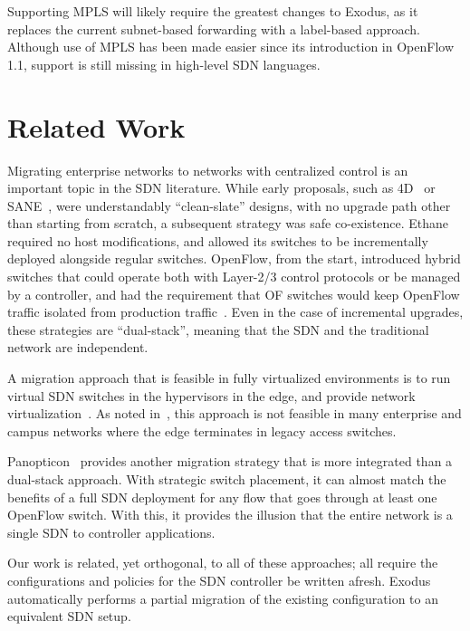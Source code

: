  Supporting MPLS will likely require the greatest changes
to Exodus, as it replaces the current subnet-based forwarding with a label-based approach.
Although use of MPLS has been made easier since its introduction in OpenFlow 1.1,
support is still missing in high-level SDN languages.

\section{Related Work}
\label{sec:relwork}

Migrating enterprise networks to networks with centralized control is
an important topic in the SDN literature. While early proposals, such as 4D~\cite{greenberg:ccr05-4d}
 or SANE~\cite{casado06sane}, were understandably ``clean-slate'' designs, with no
upgrade path other than starting from scratch, a subsequent strategy was safe co-existence.
Ethane~\cite{Casado07Ethane} required no host modifications, and allowed its switches to
be incrementally deployed alongside regular switches.
OpenFlow, from the start, introduced hybrid switches that could operate both with Layer-2/3 control
protocols or be managed by a controller, and had the requirement that OF switches would keep 
OpenFlow traffic isolated from production traffic~\cite{McKeown:ccr08-openflow}.
Even in the case of incremental upgrades, these strategies are ``dual-stack'', meaning that
the SDN and the traditional network are independent.

A migration approach that is feasible in fully virtualized
environments is to run virtual SDN switches in the hypervisors in the
edge, and provide network virtualization~\cite{Casado:hotsdn2012-fabric}.  As
noted in~\cite{levin13panopticonTR}, this approach is not feasible in many
enterprise and campus networks where the edge terminates in legacy access
switches.

Panopticon~\cite{levin13panopticonTR} provides another migration strategy that
is more integrated than a dual-stack approach. With strategic switch placement,
it can almost match the benefits of a full SDN deployment
for any flow that goes through at least one OpenFlow switch. With this, it provides
the illusion that the entire network is a single SDN to controller applications.

Our work is related, yet orthogonal, to all of these approaches; all
require the
configurations and policies for the SDN controller be written afresh.
Exodus automatically performs a partial migration of the existing configuration to an equivalent
SDN setup.

